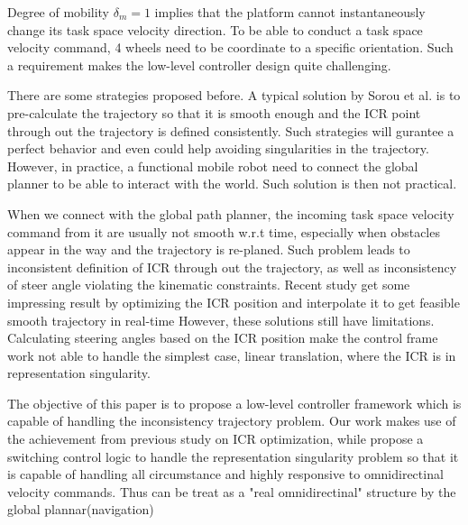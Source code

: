 Degree of mobility $\delta_m = 1$ implies that the platform cannot instantaneously change its task space velocity direction. To be able to conduct a task space velocity command, 4 wheels need to be coordinate to a specific
orientation. Such a requirement makes the low-level controller design quite challenging.

There are some strategies proposed before. A typical solution by Sorou et al. \cite{sorour2016kinematic} is to pre-calculate the trajectory so that it is smooth enough and the ICR point through out the trajectory is defined consistently. Such strategies will gurantee a perfect behavior and even could help avoiding singularities in the trajectory. However, in practice, a functional mobile robot need to connect the global planner to be able to interact with the world. Such solution is then not practical. 

When we connect with the global path planner, the incoming task space velocity command from it are usually not smooth w.r.t time, especially when obstacles appear in the way and the trajectory is re-planed. Such problem leads to inconsistent definition of ICR through out the trajectory, as well as inconsistency of steer angle violating the kinematic constraints. Recent study get some  impressing  result by optimizing the ICR position and interpolate it to get feasible smooth trajectory in real-time \cite{sorour2016motion}
However, these solutions still have limitations. Calculating steering angles based on the ICR position make the control frame work not able to handle the simplest case, linear translation, where the ICR is in representation singularity.

The objective of this paper is to propose a low-level controller framework which is capable of handling the inconsistency trajectory problem. Our work makes use of the achievement from previous study on ICR optimization, while propose a switching control logic to handle the representation singularity problem so that it is capable of handling all circumstance and highly responsive to omnidirectinal velocity commands. 
Thus can be treat as a "real omnidirectinal" structure by the global plannar(navigation)

